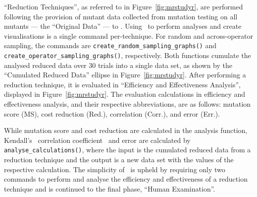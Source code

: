 ``Reduction Techniques'', as referred to in Figure~\ref{fig:mrstudyr}, are performed following the provision
of mutant data collected from mutation testing on all mutants --- the ``Original Data'' --- to \mr. Using
\mr~to perform analyses and create visualisations is a single command per-technique.
For random and across-operator sampling, the commands are {\texttt{create\_random\_sampling\_graphs()}} and
{\texttt{create\_operator\_sampling\_graphs()}}, respectively. Both functions cumulate the analysed reduced data
over 30 trials into a single data set, as shown by the ``Cumulated Reduced Data'' ellipse in
Figure~\ref{fig:mrstudyr}. After performing a reduction technique,
it is evaluated in ``Efficiency and Effectiveness Analysis'', displayed in Figure~\ref{fig:mrstudyr}.
The evaluation calculations in efficiency and effectiveness analysis, and their respective abbreviations, are as
follows: mutation score (MS), cost reduction (Red.), correlation (Corr.), and error (Err.).


While mutation score and cost reduction are calculated in the analysis function, Kendall's \taub~correlation
coefficient~\cite{mcminn2016virtual} and error are calculated by \texttt{analyse\_calculations()}, where the input is
the cumulated reduced data from a reduction technique and the output is a new data set with the values of the respective
calculation. The simplicity of \mr~is upheld by requiring only two commands to perform and analyse the efficiency and effectiveness
 of a reduction technique and is continued to the final phase, ``Human Examination''.

